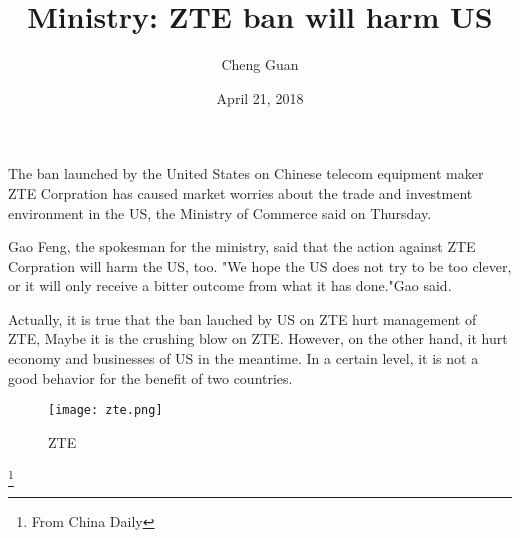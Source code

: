 \documentclass[UTF8]{article}
\author{Cheng Guan}
\date{April 21, 2018}
\title{Ministry: ZTE ban will harm US}
\begin{document}
\maketitle
    The ban launched by the United States on Chinese
  telecom equipment maker ZTE Corpration has caused market worries about
  the trade and investment environment in the US,
  the Ministry of Commerce said on Thursday.

    Gao Feng, the spokesman for the ministry,
    said that the action against ZTE Corpration will harm the US, too.
    "We hope the US does not try to be too clever,
    or it will only receive a bitter outcome from what it has done."Gao said.

    Actually, it is true that the ban lauched by US on ZTE hurt management of ZTE,
    Maybe it is the crushing blow on ZTE.
    However, on the other hand, it hurt economy and businesses of US in the meantime.
    In a certain level, it is not a good behavior for the benefit of two countries.

  \begin{figure}[ht]
       \centering
       \texttt{[image: zte.png]}
       \caption{ZTE}
       \label{fig1}
  \end{figure}
  \footnote{\centering From China Daily}
\end{document}
